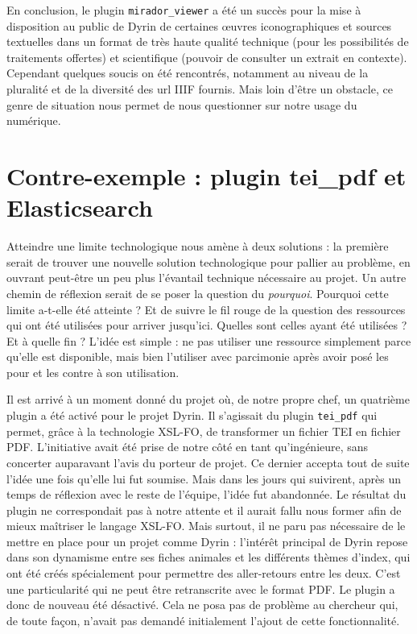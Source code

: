 \documentclass[a4paper,12pt,twoside]{book}
\begin{document}
En conclusion, le plugin \texttt{mirador\_viewer} a été un succès pour la mise à disposition au public de Dyrin de certaines \oe{}uvres iconographiques et sources textuelles dans un format de très haute qualité technique (pour les possibilités de traitements offertes) et scientifique (pouvoir de consulter un extrait en contexte). Cependant quelques soucis on été rencontrés, notamment au niveau de la pluralité et de la diversité des url \acrshort{IIIF} fournis. Mais loin d'être un obstacle, ce genre de situation nous permet de nous questionner sur notre usage du numérique.


\section{Contre-exemple : plugin tei\_pdf et Elasticsearch}
Atteindre une limite technologique nous amène à deux solutions : la première serait de trouver une nouvelle solution technologique pour pallier au problème, en ouvrant peut-être un peu plus l'évantail technique nécessaire au projet. Un autre chemin de réflexion serait de se poser la question du \textit{pourquoi}. Pourquoi cette limite a-t-elle été atteinte ?  Et de suivre le fil rouge de la question des ressources qui ont été utilisées pour arriver jusqu'ici. Quelles sont celles ayant été utilisées ? Et à quelle fin ?
L'idée est simple : ne pas utiliser une ressource simplement parce qu'elle est disponible, mais bien l'utiliser avec parcimonie après avoir posé les pour et les contre à son utilisation. 

Il est arrivé à un moment donné du projet où, de notre propre chef, un quatrième plugin a été activé pour le projet Dyrin. Il s'agissait du plugin \texttt{tei\_pdf} qui permet, grâce à la technologie \acrshort{XSL-FO}, de transformer un fichier TEI en fichier PDF. L'initiative avait été prise de notre côté en tant qu'ingénieure, sans concerter auparavant l'avis du porteur de projet. Ce dernier accepta tout de suite l'idée une fois qu'elle lui fut soumise. Mais dans les jours qui suivirent, après un temps de réflexion avec le reste de l'équipe, l'idée fut abandonnée. Le résultat du plugin ne correspondait pas à notre attente et il aurait fallu nous former afin de mieux maîtriser le langage \acrshort{XSL-FO}. Mais surtout, il ne paru pas nécessaire de le mettre en place pour un projet comme Dyrin : l'intérêt principal de Dyrin repose dans son dynamisme entre ses fiches animales et les différents thèmes d'index, qui ont été créés spécialement pour permettre des aller-retours entre les deux. C'est une particularité qui ne peut être retranscrite avec le format PDF. Le plugin a donc de nouveau été désactivé. Cela ne posa pas de problème au chercheur qui, de toute façon, n'avait pas demandé initialement l'ajout de cette fonctionnalité. 
\end{document}
